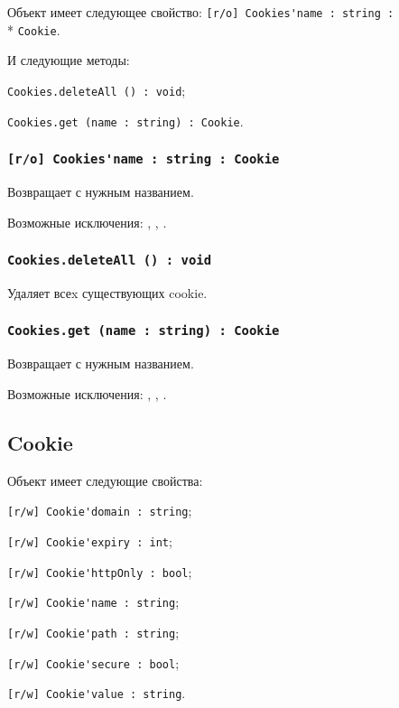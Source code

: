 Объект \cookies{} имеет следующее свойство: \lstinline|[r/o] Cookies'name : string :|\\* \lstinline|Cookie|.

И следующие методы: 
\begin{icItems}
	\item \lstinline|Cookies.deleteAll () : void|;
	\item \lstinline|Cookies.get (name : string) : Cookie|.
\end{icItems}

\subsubsection{\lstinline|[r/o] Cookies'name : string : Cookie|}

Возвращает \cookie{} с нужным названием.

Возможные исключения: , , .

\subsubsection{\lstinline|Cookies.deleteAll () : void|}

Удаляет всеx существующих cookie.

\subsubsection{\lstinline|Cookies.get (name : string) : Cookie|}

Возвращает \cookie{} с нужным названием.

Возможные исключения: , , .

\subsection{{\color{orange} Cookie}}

Объект \cookie{} имеет следующие свойства:
\begin{icItems}
	\item \lstinline|[r/w] Cookie'domain : string|;
	\item \lstinline|[r/w] Cookie'expiry : int|;
	\item \lstinline|[r/w] Cookie'httpOnly : bool|;
	\item \lstinline|[r/w] Cookie'name : string|;
	\item \lstinline|[r/w] Cookie'path : string|;
	\item \lstinline|[r/w] Cookie'secure : bool|;
	\item \lstinline|[r/w] Cookie'value : string|.
\end{icItems}

